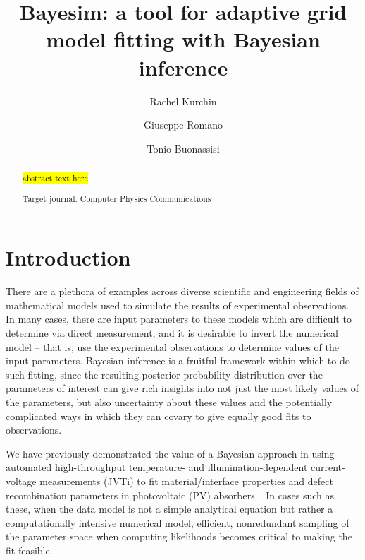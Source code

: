 \documentclass[aps,prl,amsmath,amssymb,superscriptaddress,notitlepage,groupedaddress]{revtex4-1}
\begin{document}
\title{Bayesim: a tool for adaptive grid model fitting with Bayesian inference}

\author{Rachel Kurchin}
\author{Giuseppe Romano}
\author{Tonio Buonassisi}

\begin{abstract}
  \hl{abstract text here}

  Target journal: Computer Physics Communications
\end{abstract}

\maketitle

\section*{Introduction}
  There are a plethora of examples across diverse scientific and engineering fields of mathematical models used to simulate the results of experimental observations. In many cases, there are input parameters to these models which are difficult to determine via direct measurement, and it is desirable to invert the numerical model -- that is, use the experimental observations to determine values of the input parameters. Bayesian inference is a fruitful framework within which to do such fitting, since the resulting posterior probability distribution over the parameters of interest can give rich insights into not just the most likely values of the parameters, but also uncertainty about these values and the potentially complicated ways in which they can covary to give equally good fits to observations.

  We have previously demonstrated the value of a Bayesian approach in using automated high-throughput temperature- and illumination-dependent current-voltage measurements (JVTi) to fit material/interface properties and defect recombination parameters in photovoltaic (PV) absorbers~\cite{SnSJoule,FeBayes}. In cases such as these, when the data model is not a simple analytical equation but rather a computationally intensive numerical model, efficient, nonredundant sampling of the parameter space when computing likelihoods becomes critical to making the fit feasible.
\end{document}

